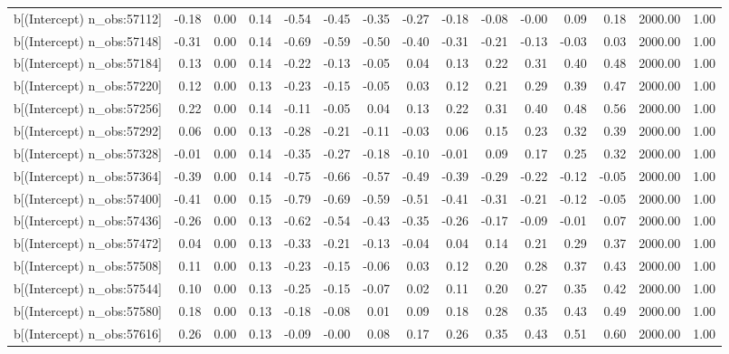 \begin{table}[ht]
\begin{tabular}{rrrrrrrrrrrrrrr}
  b[(Intercept) n\_obs:57112] & -0.18 & 0.00 & 0.14 & -0.54 & -0.45 & -0.35 & -0.27 & -0.18 & -0.08 & -0.00 & 0.09 & 0.18 & 2000.00 & 1.00 \\ 
  b[(Intercept) n\_obs:57148] & -0.31 & 0.00 & 0.14 & -0.69 & -0.59 & -0.50 & -0.40 & -0.31 & -0.21 & -0.13 & -0.03 & 0.03 & 2000.00 & 1.00 \\ 
  b[(Intercept) n\_obs:57184] & 0.13 & 0.00 & 0.14 & -0.22 & -0.13 & -0.05 & 0.04 & 0.13 & 0.22 & 0.31 & 0.40 & 0.48 & 2000.00 & 1.00 \\ 
  b[(Intercept) n\_obs:57220] & 0.12 & 0.00 & 0.13 & -0.23 & -0.15 & -0.05 & 0.03 & 0.12 & 0.21 & 0.29 & 0.39 & 0.47 & 2000.00 & 1.00 \\ 
  b[(Intercept) n\_obs:57256] & 0.22 & 0.00 & 0.14 & -0.11 & -0.05 & 0.04 & 0.13 & 0.22 & 0.31 & 0.40 & 0.48 & 0.56 & 2000.00 & 1.00 \\ 
  b[(Intercept) n\_obs:57292] & 0.06 & 0.00 & 0.13 & -0.28 & -0.21 & -0.11 & -0.03 & 0.06 & 0.15 & 0.23 & 0.32 & 0.39 & 2000.00 & 1.00 \\ 
  b[(Intercept) n\_obs:57328] & -0.01 & 0.00 & 0.14 & -0.35 & -0.27 & -0.18 & -0.10 & -0.01 & 0.09 & 0.17 & 0.25 & 0.32 & 2000.00 & 1.00 \\ 
  b[(Intercept) n\_obs:57364] & -0.39 & 0.00 & 0.14 & -0.75 & -0.66 & -0.57 & -0.49 & -0.39 & -0.29 & -0.22 & -0.12 & -0.05 & 2000.00 & 1.00 \\ 
  b[(Intercept) n\_obs:57400] & -0.41 & 0.00 & 0.15 & -0.79 & -0.69 & -0.59 & -0.51 & -0.41 & -0.31 & -0.21 & -0.12 & -0.05 & 2000.00 & 1.00 \\ 
  b[(Intercept) n\_obs:57436] & -0.26 & 0.00 & 0.13 & -0.62 & -0.54 & -0.43 & -0.35 & -0.26 & -0.17 & -0.09 & -0.01 & 0.07 & 2000.00 & 1.00 \\ 
  b[(Intercept) n\_obs:57472] & 0.04 & 0.00 & 0.13 & -0.33 & -0.21 & -0.13 & -0.04 & 0.04 & 0.14 & 0.21 & 0.29 & 0.37 & 2000.00 & 1.00 \\ 
  b[(Intercept) n\_obs:57508] & 0.11 & 0.00 & 0.13 & -0.23 & -0.15 & -0.06 & 0.03 & 0.12 & 0.20 & 0.28 & 0.37 & 0.43 & 2000.00 & 1.00 \\ 
  b[(Intercept) n\_obs:57544] & 0.10 & 0.00 & 0.13 & -0.25 & -0.15 & -0.07 & 0.02 & 0.11 & 0.20 & 0.27 & 0.35 & 0.42 & 2000.00 & 1.00 \\ 
  b[(Intercept) n\_obs:57580] & 0.18 & 0.00 & 0.13 & -0.18 & -0.08 & 0.01 & 0.09 & 0.18 & 0.28 & 0.35 & 0.43 & 0.49 & 2000.00 & 1.00 \\ 
  b[(Intercept) n\_obs:57616] & 0.26 & 0.00 & 0.13 & -0.09 & -0.00 & 0.08 & 0.17 & 0.26 & 0.35 & 0.43 & 0.51 & 0.60 & 2000.00 & 1.00 \\ 

\end{tabular}
\end{table}
